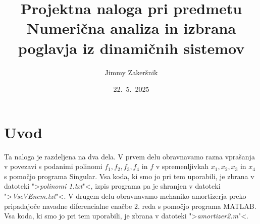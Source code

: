 \documentclass[a4paper, 10pt]{article}
\title{Projektna naloga pri predmetu Numerična analiza in izbrana poglavja iz dinamičnih sistemov}
\date{22.~5.~2025}
\author{Jimmy Zakeršnik}
\begin{document}
	\maketitle
	\thispagestyle{empty}
	\newpage
	\section{Uvod}
		Ta naloga je razdeljena na dva dela. V prvem delu obravnavamo razna vprašanja v povezavi s podanimi polinomi $f_1, f_2, f_3, f_4$ in $f$ v spremenljivkah $x_1, x_2, x_3$ in $x_4$ s pomočjo programa Singular. Vsa koda, ki smo jo pri tem uporabili, je zbrana v datoteki ">\emph{polinomi 1.txt}"<, izpis programa pa je shranjen v datoteki ">\emph{VseVEnem.txt}"<. V drugem delu obravnavamo mehaniko amortizerja preko pripadajoče navadne diferencialne enačbe $2.$ reda s pomočjo programa MATLAB. Vsa koda, ki smo jo pri tem uporabili, je zbrana v datoteki ">\emph{amortizer2.m}"<.
\end{document}
